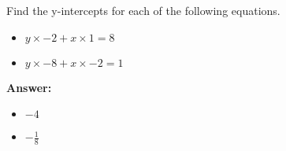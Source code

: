  Find the y-intercepts for each of the following equations. \begin{itemize}\item \( y \times -2 + x \times 1 = 8 \)\item \( y \times -8 + x \times -2 = 1 \)\end{itemize}

        \textbf{Answer:} \begin{itemize}\item \( -4 \)\item \( -\frac{1}{8} \)\end{itemize}
